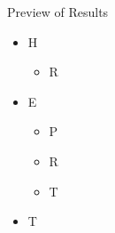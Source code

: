 \documentclass[handout]{beamer}
\begin{document}
 
\begin{frame}{Preview of Results}
\begin{itemize}[<+->]
	\item H
		\begin{itemize}
			\item R
		\end{itemize}
	\item E
		\begin{itemize}
			\item P
			\item R
			\item T
		\end{itemize}
	\item T
\end{itemize}
\end{frame}

\begin{comment}
\subsection{}
\begin{frame}
\frametitle{Related Literature}
\small Protection for Sale: Grossman $\&$ Helpman (1994)
\begin{itemize}
  \item \footnotesize Empirics: Goldberg $\&$ Maggi (1999), Gawande $\&$ Bandyopadhyay (2000), Mitra, Thomakos, $\&$  Ulubasoglu (2002)
  \item \footnotesize Mitra, Thomakos, $\&$  Ulubasoglu (2006), Bombardini (2008)
	\item \footnotesize Trade Wars and Trade Talks: Grossman $\&$ Helpman (1995)
\end{itemize}

\vskip.05in
\small Political economy shocks
\begin{itemize}
	\item \footnotesize Feenstra $\&$ Lewis (1991), Bagwell $\&$ Staiger (2001, 2005)
\end{itemize}

\vskip.05in
\small Separated powers
\begin{itemize}
	\item \footnotesize Mansfield, Milner $\&$ Rosendorff (2000), Song (2008)
\end{itemize}

\vskip.05in
\small Political uncertainty
\begin{itemize}
	\item \footnotesize Milner $\&$ Rosendorff (1997), Le Breton $\&$ Zaporozhets (2007) %
\end{itemize}
	
\end{frame}
\end{comment}
\end{document}
